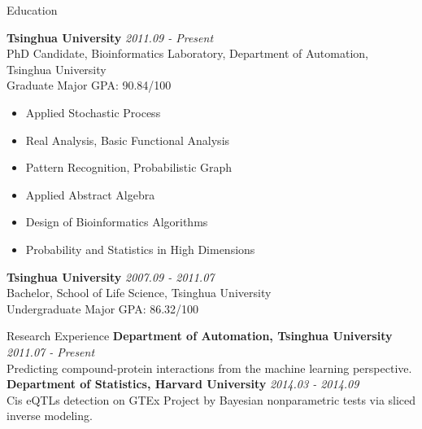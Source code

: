 \documentclass{resume} %
\begin{document}

\begin{rSection}{Education}

{\bf Tsinghua University} \hfill {\em 2011.09 - Present} \\ 
PhD Candidate, Bioinformatics Laboratory, Department of Automation, Tsinghua University\\
Graduate Major GPA: 90.84/100
\begin{multicols}{2}
  \begin{itemize}
\item Applied Stochastic Process
\item Real Analysis, Basic Functional Analysis
\item Pattern Recognition, Probabilistic Graph
\item Applied Abstract Algebra
\item Design of Bioinformatics Algorithms
\item Probability and Statistics in High Dimensions 
  \end{itemize}
\end{multicols}
{\bf Tsinghua University} \hfill {\em 2007.09 - 2011.07} \\
Bachelor, School of Life Science, Tsinghua University\\
Undergraduate Major GPA: 86.32/100
\end{rSection}
  
\begin{rSection}{Research Experience}
{\bf Department of Automation, Tsinghua University} \hfill {\em 2011.07 - Present}\\
Predicting compound-protein interactions from the machine learning perspective.\\

{\bf Department of Statistics, Harvard University} \hfill {\em 2014.03 - 2014.09} \\
Cis eQTLs detection on GTEx Project by Bayesian nonparametric tests via sliced inverse modeling.
\end{rSection}
\end{document}
